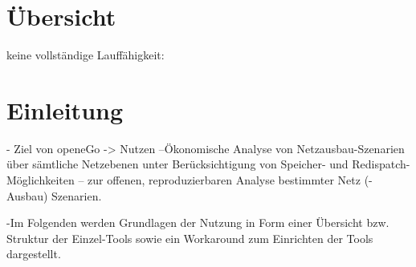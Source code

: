 \documentclass[
a4paper,     %
12pt         %
]{scrartcl}  %
\begin{document}
\section*{Übersicht}

%

keine vollständige Lauffähigkeit:

\newpage
\tableofcontents

 \newpage
 \listoffigures


\newpage
{} %



\section{Einleitung}
- Ziel von openeGo -> Nutzen
--Ökonomische Analyse von Netzausbau-Szenarien über sämtliche Netzebenen unter Berücksichtigung von Speicher- und Redispatch-Möglichkeiten
-- zur offenen, reproduzierbaren Analyse bestimmter Netz (-Ausbau) Szenarien.

-Im Folgenden werden Grundlagen der Nutzung in Form einer Übersicht bzw. Struktur der Einzel-Tools sowie ein Workaround zum Einrichten der Tools dargestellt.
\end{document}

